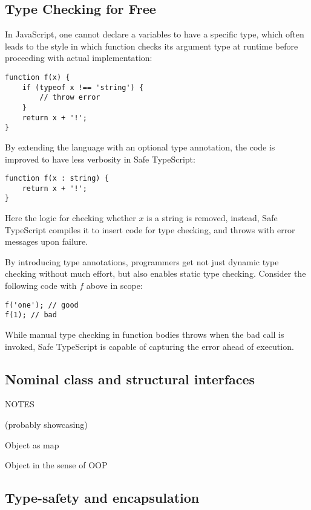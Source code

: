 \subsection{Type Checking for Free}

In JavaScript, one cannot declare a variables to have a specific type,
which often leads to the style in which function checks its argument type at runtime
before proceeding with actual implementation:

\begin{verbatim}
function f(x) {
    if (typeof x !== 'string') {
        // throw error
    }
    return x + '!';
}
\end{verbatim}

By extending the language with an optional type annotation,
the code is improved to have less verbosity in Safe TypeScript: 

\begin{verbatim}
function f(x : string) {
    return x + '!';
}
\end{verbatim}

Here the logic for checking whether $x$ is a string is removed,
instead, Safe TypeScript compiles it to insert code for type checking,
and throws with error messages upon failure.

By introducing type annotations, programmers get not just dynamic type checking without
much effort, but also enables static type checking. Consider the following code with $f$
above in scope:

\begin{verbatim}
f('one'); // good
f(1); // bad
\end{verbatim}

While manual type checking in function bodies throws when the bad call is invoked,
Safe TypeScript is capable of capturing the error ahead of execution.

\subsection{Nominal class and structural interfaces}

NOTES

(probably showcasing)

Object as map

Object in the sense of OOP

\subsection{Type-safety and encapsulation}

